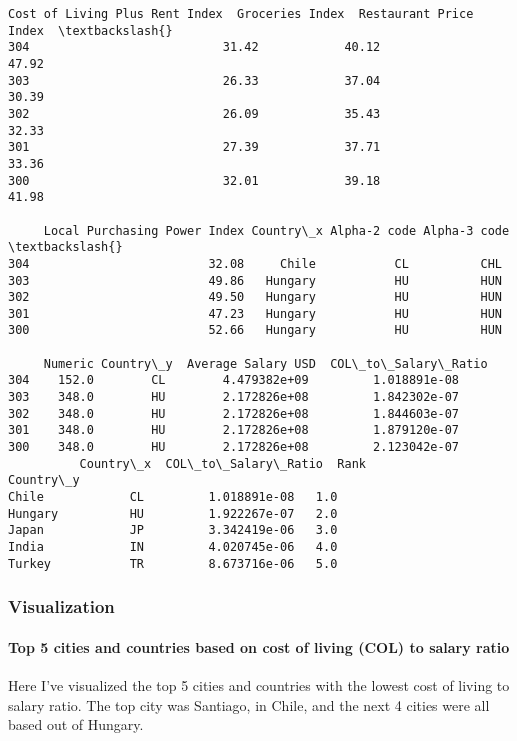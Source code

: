 \documentclass[11pt]{article}
\begin{document}
\begin{Verbatim}[commandchars=\\\{\}]
     Cost of Living Plus Rent Index  Groceries Index  Restaurant Price Index  \textbackslash{}
304                           31.42            40.12                   47.92
303                           26.33            37.04                   30.39
302                           26.09            35.43                   32.33
301                           27.39            37.71                   33.36
300                           32.01            39.18                   41.98

     Local Purchasing Power Index Country\_x Alpha-2 code Alpha-3 code  \textbackslash{}
304                         32.08     Chile           CL          CHL
303                         49.86   Hungary           HU          HUN
302                         49.50   Hungary           HU          HUN
301                         47.23   Hungary           HU          HUN
300                         52.66   Hungary           HU          HUN

     Numeric Country\_y  Average Salary USD  COL\_to\_Salary\_Ratio
304    152.0        CL        4.479382e+09         1.018891e-08
303    348.0        HU        2.172826e+08         1.842302e-07
302    348.0        HU        2.172826e+08         1.844603e-07
301    348.0        HU        2.172826e+08         1.879120e-07
300    348.0        HU        2.172826e+08         2.123042e-07
          Country\_x  COL\_to\_Salary\_Ratio  Rank
Country\_y
Chile            CL         1.018891e-08   1.0
Hungary          HU         1.922267e-07   2.0
Japan            JP         3.342419e-06   3.0
India            IN         4.020745e-06   4.0
Turkey           TR         8.673716e-06   5.0
    \end{Verbatim}

    \hypertarget{visualization}{%
\subsubsection{Visualization}\label{visualization}}

    \hypertarget{top-5-cities-and-countries-based-on-cost-of-living-col-to-salary-ratio}{%
\paragraph{Top 5 cities and countries based on cost of living (COL) to
salary
ratio}\label{top-5-cities-and-countries-based-on-cost-of-living-col-to-salary-ratio}}

    Here I've visualized the top 5 cities and countries with the lowest cost
of living to salary ratio. The top city was Santiago, in Chile, and the
next 4 cities were all based out of Hungary.
\end{document}

